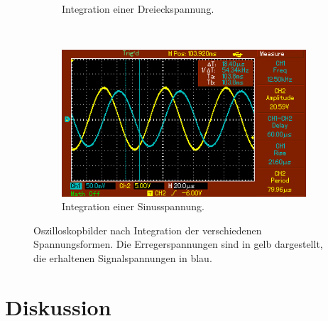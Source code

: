 \begin{figure}
\begin{subfigure}{0.49\textwidth}
    \qquad
    \caption{Integration einer Dreieckspannung.}
    \label{sub:2}
  \end{subfigure}\\
  \begin{subfigure}{0.49\textwidth}
  \centering
    \includegraphics[width=\textwidth]{sinus.png}
    \qquad
    \caption{Integration einer Sinusspannung.}
    \label{sub:3}
  \end{subfigure}
  \caption{Oszilloskopbilder nach Integration der verschiedenen Spannungsformen.
  Die Erregerspannungen sind in gelb dargestellt, die erhaltenen Signalspannungen in blau.}
\label{abb:4}
\end{figure}

\section{Diskussion}
\newpage
\nocite{*}
\printbibliography

